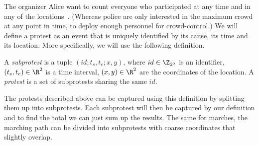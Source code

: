 
The organizer Alice want to count everyone who participated at any time and in 
any of the locations~\cite{2016DemonstrationsInSeoul}.
(Whereas police are only interested in the maximum crowd at any point in time, 
to deploy enough personnel for crowd-control.)
We will define a protest as an event that is uniquely identified by its cause, 
its time and its location.
More specifically, we will use the following definition.

\begin{definition}[Protest]\label{DefProtest}
  A \emph{subprotest} is a tuple \((id; t_s, t_e; x, y)\), where
  \(id\in \Z_{2^\lambda}\) is an identifier,
  \((t_s, t_e)\in \R^2\) is a time interval,
  \((x, y)\in \R^2\) are the coordinates of the location.
  A \emph{protest} is a set of subprotests sharing the same \(id\).
\end{definition}


The protests described above can be captured using this definition by splitting 
them up into subprotests.
Each subprotest will then be captured by our definition and to find the total 
we can just sum up the results.
The same for marches, the marching path can be divided into subprotests with 
coarse coordinates that slightly overlap.

